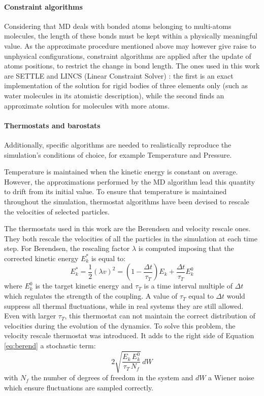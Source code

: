 \paragraph{Constraint algorithms} Considering that MD deals with bonded atoms belonging to multi-atoms molecules, the length of these bonds must be kept within a physically meaningful value. As the approximate procedure mentioned above may however give raise to unphysical configurations, constraint algorithms are applied after the update of atoms positions, to restrict the change in bond length. The ones used in this work are SETTLE \citep{Miyamoto1992} and LINCS (Linear Constraint Solver) \citep{Hess1997}: the first is an exact implementation of the solution for rigid bodies of three elements only (such as water molecules in its atomistic description), while the second finds an approximate solution for molecules with more atoms.

\paragraph{Thermostats and barostats} Additionally, specific algorithms are needed to realistically reproduce the simulation's conditions of choice, for example Temperature and Pressure.

Temperature is maintained when the kinetic energy is constant on average. However, the approximations performed by the MD algorithm lead this quantity to drift from its initial value. To ensure that temperature is maintained throughout the simulation, thermostat algorithms have been devised to rescale the velocities of selected particles.

The thermostats used in this work are the Berendsen \citep{Berendsen1984} and velocity rescale \citep{Bussi2007} ones.
They both rescale the velocities of all the particles in the simulation at each time step. For Berendsen, the rescaling factor $\lambda$ is computed imposing that the corrected kinetic energy $E^*_k$ is equal to:
\begin{equation} \label{eq:berend}
    E^*_k = \frac{1}{2} \left(\lambda v\right)^2  = \left( 1 - \frac{\Delta t}{\tau_T} \right) E_k + \frac{\Delta t}{\tau_T} E_k^0
\end{equation}
where $E_k^0$ is the target kinetic energy and $\tau_T$ is a time interval multiple of $\Delta t$ which regulates the strength of the coupling. A value of $\tau_T$ equal to $\Delta t$ would suppress all thermal fluctuations, while in real systems they are still allowed. Even with larger $\tau_T$, this thermostat can not maintain the correct distribution of velocities during the evolution of the dynamics. To solve this problem, the velocity rescale thermostat was introduced. It adds to the right side of Equation \ref{eq:berend} a stochastic term:
\begin{equation}
    2 \sqrt{\frac{E_k\,E_k^0}{\tau_T\,N_f}}\, dW
\end{equation}
with $N_f$ the number of degrees of freedom in the system and $dW$ a Wiener noise \citep{Durrett2010} which ensure fluctuations are sampled correctly.


